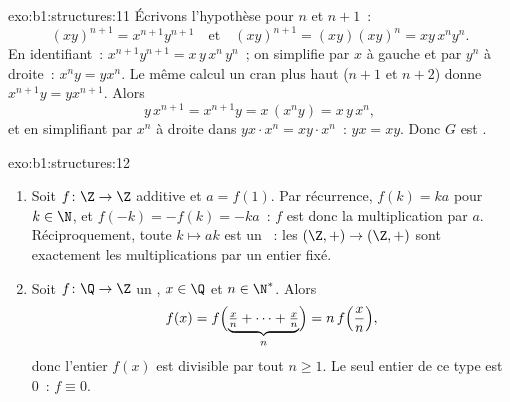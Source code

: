 \begin{solution}{exo:b1:structures:11}
Écrivons l'hypothèse pour $n$ et $n+1$~:
\[
(xy)^{n+1} = x^{n+1} y^{n+1}
\quad\text{et}\quad
(xy)^{n+1} = (xy)(xy)^n = xy\,x^n y^n .
\]
En identifiant~: $x^{n+1} y^{n+1} = x\,y\,x^n\,y^n$~; on simplifie par
$x$ à gauche et par $y^n$ à droite~: $x^n y = y x^n$. Le même calcul un
cran plus haut ($n+1$ et $n+2$) donne $x^{n+1} y = y x^{n+1}$. Alors
\[
y\,x^{n+1} = x^{n+1} y = x\,(x^n y) = x\,y\,x^n ,
\]
et en simplifiant par $x^n$ à droite dans $y x \cdot x^n = x y \cdot
x^n$~: $yx = xy$. Donc $G$ est .
\end{solution}

\begin{solution}{exo:b1:structures:12}
\begin{enumerate}
  \item Soit $f \colon \Z \to \Z$ additive et $a = f(1)$. Par
        récurrence, $f(k) = ka$ pour $k \in \N$, et $f(-k) = -f(k) =
        -ka$~: $f$ est donc la multiplication par $a$. Réciproquement,
        toute  $k \mapsto ak$ est un ~: les
         $(\Z,+) \to (\Z,+)$ sont exactement les
        multiplications par un entier fixé.
  \item Soit $f \colon \Q \to \Z$ un , $x \in \Q$ et
        $n \in \N^*$. Alors
        \[
        f(x) = f\Bigl(\underbrace{\tfrac xn + \dots +
        \tfrac xn}_{n}\Bigr) = n\,f\Bigl(\frac xn\Bigr) ,
        \]
        donc l'entier $f(x)$ est divisible par tout $n \geq 1$.
        Le seul entier de ce type est $0$~: $f \equiv 0$.
\end{enumerate}
\end{solution}

